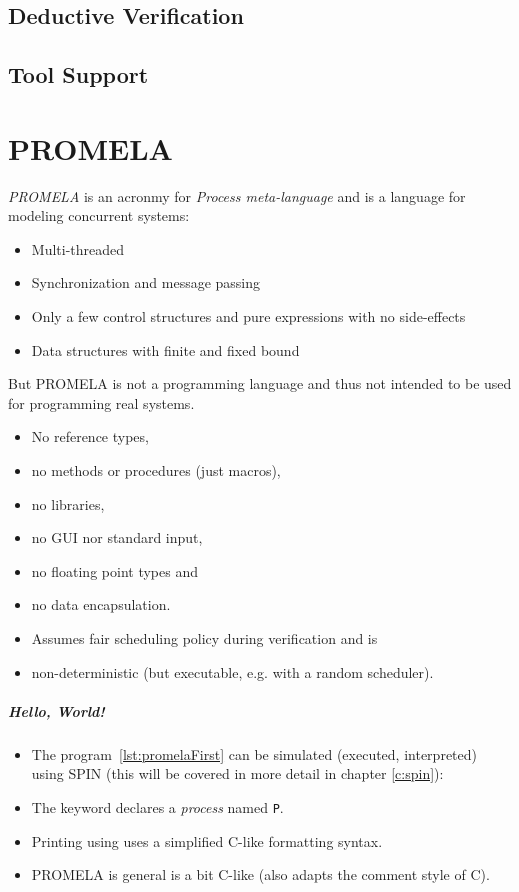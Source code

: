 	\section{Deductive Verification} %

	\section{Tool Support} %

\chapter{PROMELA}
\textit{PROMELA} is an acronmy for \textit{Process meta-language} and is a language for modeling concurrent systems:
\begin{itemize}
	\item Multi-threaded
	\item Synchronization and message passing
	\item Only a few control structures and pure expressions with no side-effects
	\item Data structures with finite and fixed bound
\end{itemize}
But PROMELA is not a programming language and thus not intended to be used for programming real systems.
\begin{itemize}
	\item No reference types,
	\item no methods or procedures (just macros),
	\item no libraries,
	\item no GUI nor standard input,
	\item no floating point types and
	\item no data encapsulation.
	\item Assumes fair scheduling policy during verification and is
	\item non-deterministic (but executable, e.g. with a random scheduler).
\end{itemize}

\paragraph{Hello, World!}
	

	\begin{itemize}
		\item The program~\ref{lst:promelaFirst} can be simulated (executed, interpreted) using SPIN (this will be covered in more detail in chapter \ref{c:spin}):
		\item The keyword  declares a \textit{process} named \texttt{P}.
		\item Printing using  uses a simplified C-like formatting syntax.
		\item PROMELA is general is a bit C-like (also adapts the comment style of C).
	\end{itemize}


